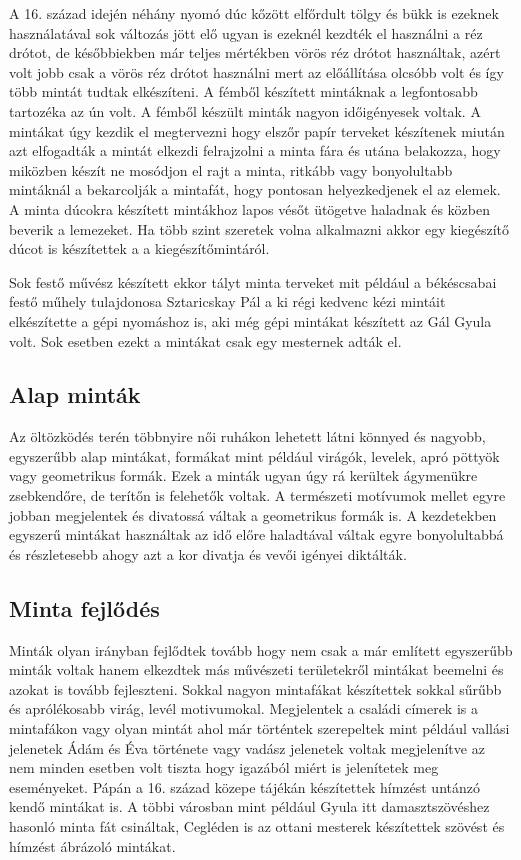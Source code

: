 \documentclass[fontsize=12pt, appendixprefix=true]{scrreprt}
\begin{document}
A 16. század idején néhány nyomó dúc kőzött elfőrdult tölgy és bükk is ezeknek használatával sok változás jött elő ugyan is ezeknél kezdték el használni a réz drótot, de későbbiekben már teljes mértékben vörös réz drótot használtak, azért volt jobb csak a vörös réz drótot használni mert az előállítása olcsóbb volt és így több mintát tudtak elkészíteni.
A fémből készített mintáknak a legfontosabb tartozéka az ún volt. A fémből készült minták nagyon időigényesek voltak. A mintákat úgy kezdik el megtervezni hogy elszőr papír terveket készítenek miután azt elfogadták a mintát elkezdi felrajzolni a minta fára és utána belakozza, hogy miközben készít ne mosódjon el rajt a minta, ritkább vagy bonyolultabb mintáknál a bekarcolják a mintafát, hogy pontosan helyezkedjenek el az elemek.
A minta dúcokra készített mintákhoz lapos vésőt ütögetve haladnak és közben beverik a lemezeket. Ha több szint szeretek volna alkalmazni akkor egy kiegészítő dúcot is készítettek a a kiegészítőmintáról.

Sok festő művész készített ekkor tályt minta terveket mit például a békéscsabai festő műhely tulajdonosa Sztaricskay Pál a ki régi kedvenc kézi mintáit elkészítette a gépi nyomáshoz is, aki még  gépi mintákat készített az Gál Gyula volt. Sok esetben ezekt a mintákat csak egy mesternek adták el.

\subsection{Alap minták}
Az öltözködés terén többnyire női ruhákon lehetett látni könnyed és nagyobb, egyszerűbb alap mintákat, formákat mint például virágók, levelek, apró pöttyök vagy geometrikus formák.
Ezek a minták ugyan úgy rá kerültek ágymenükre zsebkendőre, de terítőn is felehetők voltak.
A természeti motívumok mellet egyre jobban megjelentek és divatossá váltak a geometrikus formák is.
A kezdetekben egyszerű mintákat használtak az idő előre haladtával váltak egyre bonyolultabbá és részletesebb ahogy azt a kor divatja és vevői igényei diktálták.

\subsection{Minta fejlődés}
Minták olyan irányban fejlődtek tovább hogy nem csak a már említett egyszerűbb minták voltak hanem  elkezdtek más művészeti területekről mintákat beemelni és azokat is tovább fejleszteni.
Sokkal nagyon mintafákat készítettek sokkal sűrűbb és aprólékosabb virág, levél motivumokal. Megjelentek a családi címerek is a mintafákon vagy olyan mintát ahol már történtek szerepeltek mint például vallási jelenetek Ádám és Éva története vagy vadász jelenetek voltak megjelenítve az nem minden esetben volt tiszta hogy igazából miért is jelenítetek meg eseményeket. Pápán a 16. század közepe tájékán  készítettek hímzést untánzó kendő mintákat is. A többi városban mint például Gyula itt damasztszövéshez hasonló minta fát csináltak, Cegléden is az ottani mesterek készítettek szövést és hímzést ábrázoló mintákat.
\end{document}
